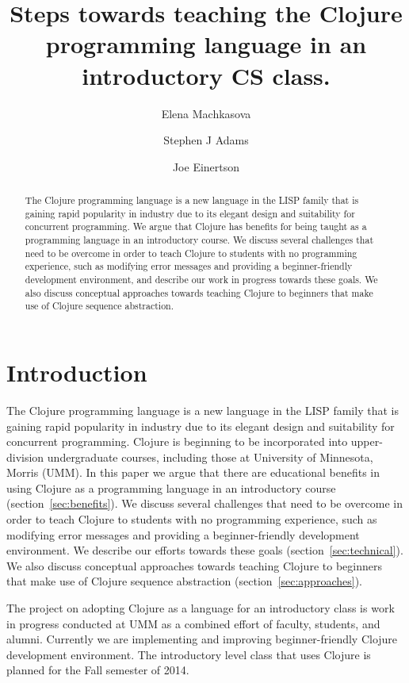 \documentclass[submission,copyright,creativecommons]{eptcs}
\title{Steps towards teaching the Clojure programming language in an introductory CS  class.}
\author{Elena Machkasova 
\institute{University of Minnesota, Morris
\email{elenam@morris.umn.edu}}
\and
Stephen J Adams 
\institute{\email{adams601@morris.umn.edu}}
\and 
Joe Einertson 
\institute{University of Minnesota, Morris
\email{eine0017@morris.umn.edu}}
}
\newcommand{\allcomments}[1]{{#1}}
\newcommand{\joecomment}[1]{{\bf \color{JoesGold}{\allcomments{{#1}}}}}
\begin{document}
\maketitle

\begin{abstract}
The Clojure programming language is a new language in the LISP family that is gaining rapid popularity in industry due to its elegant design and suitability for concurrent programming. We argue that Clojure has benefits for being taught as a programming language in an introductory course. We discuss several challenges that need to be overcome in order to teach Clojure to students with no programming experience, such as modifying error messages and providing a beginner-friendly development environment, and describe our work in progress towards these goals. We also discuss conceptual approaches towards teaching Clojure to beginners that make use of Clojure sequence abstraction. 
\end{abstract}

\section{Introduction}
The Clojure programming language is a new language in the LISP family that is gaining rapid popularity in industry due to its elegant design and suitability for concurrent programming. Clojure is beginning to be incorporated into upper-division undergraduate courses, including those at University of Minnesota, Morris (UMM). In this paper we argue that there are educational benefits in using Clojure as a programming language in an introductory course (section~\ref{sec:benefits}). We discuss several challenges that need to be overcome in order to teach Clojure to students with no programming experience, such as modifying error messages and providing a beginner-friendly development environment. We describe our efforts towards these goals (section~\ref{sec:technical}). We also discuss conceptual approaches towards teaching Clojure to beginners that make use of Clojure sequence abstraction (section~\ref{sec:approaches}). 

The project on adopting Clojure as a language for an introductory class is work in progress conducted at UMM as a combined effort of faculty, students, and alumni. Currently we are implementing and improving beginner-friendly Clojure development environment. 
The introductory level class that uses Clojure is planned for the Fall semester of 2014. 
\end{document}
